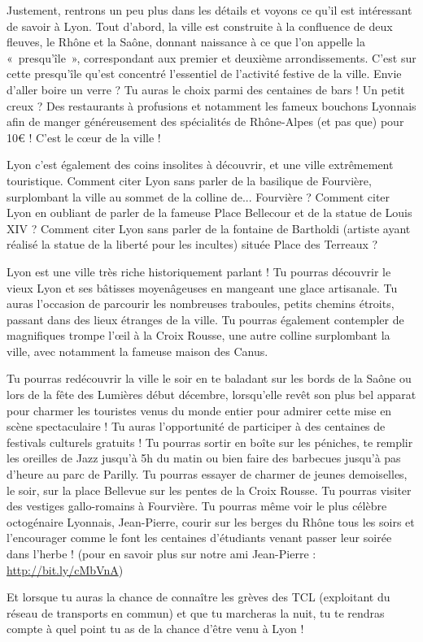 \vspace{1em}

Justement, rentrons un peu plus dans les détails et voyons ce qu'il est
intéressant de savoir à Lyon. Tout d'abord, la ville est construite à la
confluence de deux fleuves, le Rhône et la Saône, donnant naissance à ce que
l'on appelle la «~presqu'île~», correspondant aux premier et deuxième arrondissements.
C'est sur cette presqu'île qu'est concentré l'essentiel de l'activité festive
de la ville. Envie d'aller boire un verre ? Tu auras le choix parmi des
centaines de bars ! Un petit creux ? Des restaurants à profusions et notamment
les fameux bouchons Lyonnais afin de manger généreusement des spécialités de
Rhône-Alpes (et pas que) pour 10€ ! C'est le cœur de la ville !

\vspace{1em}

Lyon c'est également des coins insolites à découvrir, et une ville extrêmement
touristique. Comment citer Lyon sans parler de la basilique de Fourvière,
surplombant la ville au sommet de la colline de... Fourvière ? Comment citer
Lyon en oubliant de parler de la fameuse Place Bellecour et de la statue de
Louis XIV ? Comment citer Lyon sans parler de la fontaine de Bartholdi (artiste
ayant réalisé la statue de la liberté pour les incultes) située Place des Terreaux ?

\vspace{1em}

Lyon est une ville très riche historiquement parlant ! Tu pourras découvrir le
vieux Lyon et ses bâtisses moyenâgeuses en mangeant une glace artisanale. Tu
auras l'occasion de parcourir les nombreuses traboules, petits chemins étroits, passant dans
des lieux étranges de la ville. Tu
pourras également contempler de magnifiques trompe l'œil à la Croix Rousse, une
autre colline surplombant la ville, avec notamment la fameuse maison des Canus.

\vspace{1em}

Tu pourras redécouvrir la ville le soir en te
baladant sur les bords de la Saône ou lors de la fête des Lumières début décembre,
lorsqu'elle revêt son plus bel apparat pour charmer les touristes
venus du monde entier pour admirer cette mise en scène spectaculaire !
Tu auras l'opportunité de participer à des centaines de festivals culturels gratuits
! Tu pourras sortir en boîte sur les péniches, te remplir les
oreilles de Jazz jusqu'à 5h du matin ou bien faire des barbecues
jusqu'à pas d'heure au parc de Parilly. Tu pourras essayer de
charmer de jeunes demoiselles, le soir, sur la place Bellevue sur les
pentes de la Croix Rousse. Tu pourras visiter des vestiges gallo-romains
à Fourvière. Tu pourras même voir le plus célèbre octogénaire
Lyonnais, Jean-Pierre, courir sur les berges du Rhône tous les soirs et
l'encourager comme le font les centaines d'étudiants venant passer leur
soirée dans l'herbe ! (pour en savoir plus sur notre ami Jean-Pierre : \url{http://bit.ly/cMbVnA})

\vspace{1em}

Et lorsque tu auras la chance de connaître les grèves des TCL (exploitant du
réseau de transports en commun) et que tu marcheras la nuit, tu te
rendras compte à quel point tu as de la chance d'être venu à Lyon !


